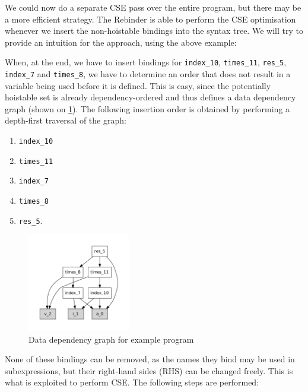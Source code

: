 We could now do a separate CSE pass over the entire program, but there
may be a more efficient strategy.  The Rebinder is able to perform the
CSE optimisation whenever we insert the non-hoistable bindings into
the syntax tree.  We will try to provide an intuition for the
approach, using the above example:

When, at the end, we have to insert bindings for \texttt{index\_10},
\texttt{times\_11}, \texttt{res\_5}, \texttt{index\_7} and
\texttt{times\_8}, we have to determine an order that does not result
in a variable being used before it is defined.  This is easy, since
the potentially hoistable set is already dependency-ordered and thus
defines a data dependency graph (shown on
\cref{fig:rebinder-example-graph}).  The following insertion order is
obtained by performing a depth-first traversal of the graph:

\begin{enumerate}
\item \texttt{index\_10}
\item \texttt{times\_11}
\item \texttt{index\_7}
\item \texttt{times\_8}
\item \texttt{res\_5}.
\end{enumerate}

\begin{figure}
\centering
\includegraphics[width=4.5cm]{img/rebinder-ddg.pdf}
\caption{Data dependency graph for example program}
\label{fig:rebinder-example-graph}
\end{figure}

None of these bindings can be removed, as the names they bind may be
used in subexpressions, but their right-hand sides (RHS) can be
changed freely.  This is what is exploited to perform CSE.  The
following steps are performed:

